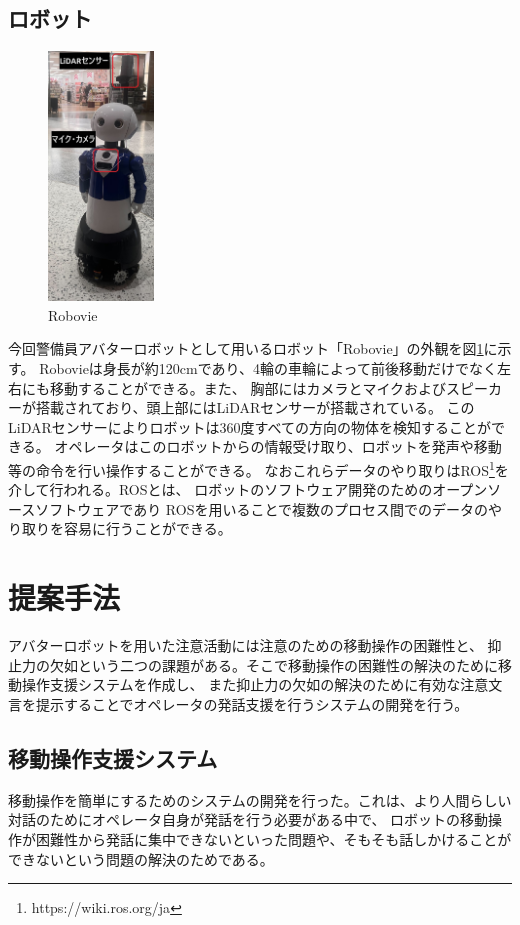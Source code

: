 \documentclass{kuisthesis}
\begin{document}
\subsection{ロボット}
\begin{figure}
  \centering
  \includegraphics[width=0.25\textwidth]{img/robovie.jpg}
  \caption{Robovie}
  \label{pic:robovie}
\end{figure}
今回警備員アバターロボットとして用いるロボット「Robovie」の外観を図\ref{pic:robovie}に示す。
Robovieは身長が約120cmであり、4輪の車輪によって前後移動だけでなく左右にも移動することができる。また、
胸部にはカメラとマイクおよびスピーカーが搭載されており、頭上部にはLiDARセンサーが搭載されている。
このLiDARセンサーによりロボットは360度すべての方向の物体を検知することができる。
オペレータはこのロボットからの情報受け取り、ロボットを発声や移動等の命令を行い操作することができる。
なおこれらデータのやり取りはROS\footnote{https://wiki.ros.org/ja}を介して行われる。ROSとは、
ロボットのソフトウェア開発のためのオープンソースソフトウェアであり
ROSを用いることで複数のプロセス間でのデータのやり取りを容易に行うことができる。

\clearpage

\section{提案手法}

アバターロボットを用いた注意活動には注意のための移動操作の困難性と、
抑止力の欠如という二つの課題がある。そこで移動操作の困難性の解決のために移動操作支援システムを作成し、
また抑止力の欠如の解決のために有効な注意文言を提示することでオペレータの発話支援を行うシステムの開発を行う。

\subsection{移動操作支援システム}
移動操作を簡単にするためのシステムの開発を行った。これは、より人間らしい対話のためにオペレータ自身が発話を行う必要がある中で、
ロボットの移動操作が困難性から発話に集中できないといった問題や、そもそも話しかけることができないという問題の解決のためである。
\end{document}
